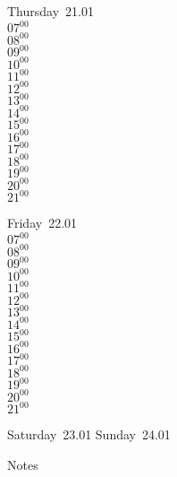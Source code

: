 \documentclass[11pt,a4paper]{book}\usepackage[]{graphicx}\usepackage[]{color}
\begin{document}
\clearpage
\begin{headerbox}
\end{headerbox}
\begin{weekdaybox}
  Thursday~21.01\\
  { 
  \vfill
  $07^{00}$\\
$08^{00}$\\
$09^{00}$\\
$10^{00}$\\
$11^{00}$\\
$12^{00}$\\
$13^{00}$\\
$14^{00}$\\
$15^{00}$\\
$16^{00}$\\
$17^{00}$\\
$18^{00}$\\
$19^{00}$\\
$20^{00}$\\
$21^{00}$\\
  }
\end{weekdaybox} 
\begin{weekdaybox}
  Friday~22.01\\
  { 
  \vfill
  $07^{00}$\\
$08^{00}$\\
$09^{00}$\\
$10^{00}$\\
$11^{00}$\\
$12^{00}$\\
$13^{00}$\\
$14^{00}$\\
$15^{00}$\\
$16^{00}$\\
$17^{00}$\\
$18^{00}$\\
$19^{00}$\\
$20^{00}$\\
$21^{00}$\\
  }
\end{weekdaybox}
\begin{weekendbox}
  Saturday~23.01
  \tcblower
  Sunday~24.01
\end{weekendbox} %
\begin{notebox}
  Notes
\end{notebox}
\clearpage
\end{document}
